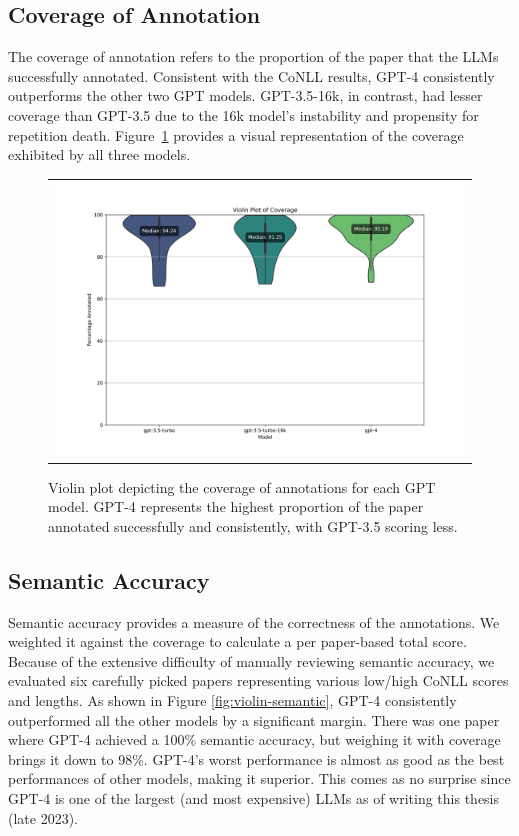 \subsection{Coverage of Annotation}

The coverage of annotation refers to the proportion of the paper that the LLMs successfully annotated. Consistent with the CoNLL results, GPT-4 consistently outperforms the other two GPT models. GPT-3.5-16k, in contrast, had lesser coverage than GPT-3.5 due to the 16k model's instability and propensity for repetition death. %
Figure~\ref{fig:violin-coverage} provides a visual representation of the coverage exhibited by all three models.

\begin{figure}[ht]
  \centering
  \begin{tabular}{c}
  \includegraphics[width=14cm]{images/coverage.png}
  \end{tabular}
  \caption[Distribution of Coverage]{Violin plot depicting the coverage of annotations for each GPT model. GPT-4 represents the highest proportion of the paper annotated successfully and consistently, with GPT-3.5 scoring less.}\label{fig:violin-coverage}
\end{figure}
 
\subsection{Semantic Accuracy}
Semantic accuracy provides a measure of the correctness of the annotations. We weighted it against the coverage to calculate a per paper-based total score. Because of the extensive difficulty of manually reviewing semantic accuracy, we evaluated six carefully picked papers representing various low/high CoNLL scores and lengths. As shown in Figure \ref{fig:violin-semantic}, GPT-4 consistently outperformed all the other models by a significant margin. There was one paper where GPT-4 achieved a 100\% semantic accuracy, but weighing it with coverage brings it down to 98\%. GPT-4's worst performance is almost as good as the best performances of other models, making it superior. This comes as no surprise since GPT-4 is one of the largest (and most expensive) LLMs as of writing this thesis (late 2023).

